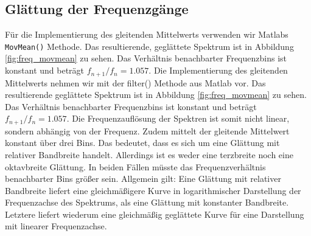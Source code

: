 \subsection{Glättung der Frequenzgänge}
\label{subsec:b}
Für die Implementierung des gleitenden Mittelwerts verwenden wir Matlabs \texttt{MovMean()} Methode.
Das resultierende, geglättete Spektrum ist in Abbildung \ref{fig:freq_movmean} zu sehen. Das Verhältnis benachbarter Frequenzbins ist konstant und beträgt $f_{n+1}/f_{n} = 1.057$.
Die Implementierung des gleitenden Mittelwerts nehmen wir mit der filter() Methode aus Matlab vor.
Das resultierende geglättete Spektrum ist in Abbildung \ref{fig:freq_movmean} zu sehen. Das Verhältnis benachbarter Frequenzbins ist konstant und beträgt $f_{n+1}/f_{n} = 1.057$.
Die Frequenzauflösung der Spektren ist somit nicht linear, sondern abhängig von der Frequenz.
Zudem mittelt der gleitende Mittelwert konstant über drei Bins.
Das bedeutet, dass es sich um eine Glättung mit relativer Bandbreite handelt.
Allerdings ist es weder eine terzbreite noch eine oktavbreite Glättung.
In beiden Fällen müsste das Frequenzverhältnis benachbarter Bins größer sein.
Allgemein gilt: Eine Glättung mit relativer Bandbreite liefert eine gleichmäßigere Kurve in logarithmischer Darstellung der Frequenzachse des Spektrums, als eine Glättung mit konstanter Bandbreite.
Letztere liefert wiederum eine gleichmäßig geglättete Kurve für eine Darstellung mit linearer Frequenzachse.

